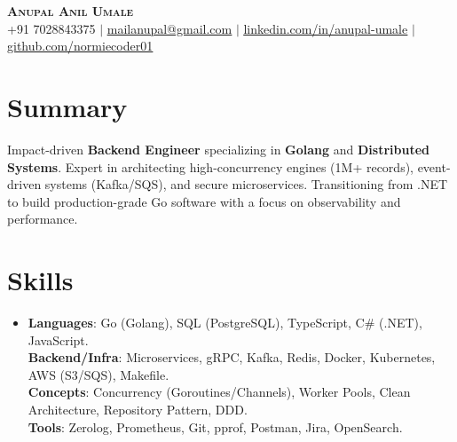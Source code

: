 \documentclass[letterpaper,11pt]{article}
\begin{document}
\begin{center}
    \textbf{\Huge \scshape Anupal Anil Umale} \\ \vspace{1pt}
    \small +91 7028843375 $|$ \href{mailto:mailanupal@gmail.com}{\underline{mailanupal@gmail.com}} $|$ 
    \href{https://linkedin.com/in/anupal-umale}{\underline{linkedin.com/in/anupal-umale}} $|$
    \href{https://github.com/normiecoder01}{\underline{github.com/normiecoder01}}
\end{center}

\section{Summary}
\small{Impact-driven \textbf{Backend Engineer} specializing in \textbf{Golang} and \textbf{Distributed Systems}. Expert in architecting high-concurrency engines (1M+ records), event-driven systems (Kafka/SQS), and secure microservices. Transitioning from .NET to build production-grade Go software with a focus on observability and performance.}

\section{Skills}
\begin{itemize}[leftmargin=0.15in, label={}, nosep]
    \item \small{
     \textbf{Languages}: Go (Golang), SQL (PostgreSQL), TypeScript, C\# (.NET), JavaScript. \\
     \textbf{Backend/Infra}: Microservices, gRPC, Kafka, Redis, Docker, Kubernetes, AWS (S3/SQS), Makefile. \\
     \textbf{Concepts}: Concurrency (Goroutines/Channels), Worker Pools, Clean Architecture, Repository Pattern, DDD. \\
     \textbf{Tools}: Zerolog, Prometheus, Git, pprof, Postman, Jira, OpenSearch.
    }
\end{itemize}

\end{document}
